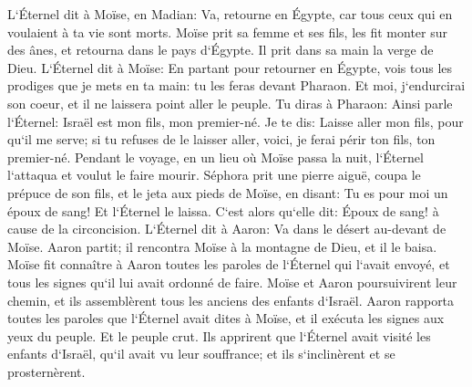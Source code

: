 \verse L`Éternel dit à Moïse, en Madian: Va, retourne en Égypte, car tous ceux qui en voulaient à ta vie sont morts. 
\verse Moïse prit sa femme et ses fils, les fit monter sur des ânes, et retourna dans le pays d`Égypte. Il prit dans sa main la verge de Dieu. 
\verse L`Éternel dit à Moïse: En partant pour retourner en Égypte, vois tous les prodiges que je mets en ta main: tu les feras devant Pharaon. Et moi, j`endurcirai son coeur, et il ne laissera point aller le peuple. 
\verse Tu diras à Pharaon: Ainsi parle l`Éternel: Israël est mon fils, mon premier-né. 
\verse Je te dis: Laisse aller mon fils, pour qu`il me serve; si tu refuses de le laisser aller, voici, je ferai périr ton fils, ton premier-né. 
\verse Pendant le voyage, en un lieu où Moïse passa la nuit, l`Éternel l`attaqua et voulut le faire mourir. 
\verse Séphora prit une pierre aiguë, coupa le prépuce de son fils, et le jeta aux pieds de Moïse, en disant: Tu es pour moi un époux de sang! 
\verse Et l`Éternel le laissa. C`est alors qu`elle dit: Époux de sang! à cause de la circoncision. 
\verse L`Éternel dit à Aaron: Va dans le désert au-devant de Moïse. Aaron partit; il rencontra Moïse à la montagne de Dieu, et il le baisa. 
\verse Moïse fit connaître à Aaron toutes les paroles de l`Éternel qui l`avait envoyé, et tous les signes qu`il lui avait ordonné de faire. 
\verse Moïse et Aaron poursuivirent leur chemin, et ils assemblèrent tous les anciens des enfants d`Israël. 
\verse Aaron rapporta toutes les paroles que l`Éternel avait dites à Moïse, et il exécuta les signes aux yeux du peuple. 
\verse Et le peuple crut. Ils apprirent que l`Éternel avait visité les enfants d`Israël, qu`il avait vu leur souffrance; et ils s`inclinèrent et se prosternèrent. 

\chapter{}

